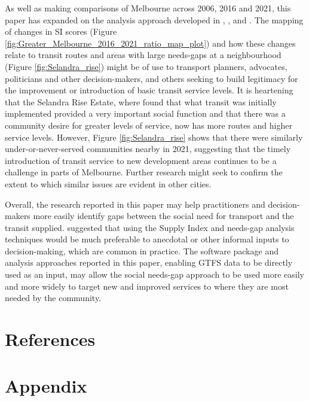 \documentclass[preprint, 3p,
authoryear]{elsarticle} %
\begin{document}
As well as making comparisons of Melbourne across 2006, 2016 and 2021,
this paper has expanded on the analysis approach developed in
\citet{Currie2003Hobart}, \citet{Currie2004Gap},
\citet{Currie2007Identifying} and \citet{currie2010identifying}. The
mapping of changes in SI scores (Figure
\ref{fig:Greater_Melbourne_2016_2021_ratio_map_plot}) and how these
changes relate to transit routes and areas with large needs-gaps at a
neighbourhood (Figure \ref{fig:Selandra_rise}) might be of use to
transport planners, advocates, politicians and other decision-makers,
and others seeking to build legitimacy for the improvement or
introduction of basic transit service levels. It is heartening that the
Selandra Rise Estate, where \citet{delbosc2015impact} found that what
transit was initially implemented provided a very important social
function and that there was a community desire for greater levels of
service, now has more routes and higher service levels. However, Figure
\ref{fig:Selandra_rise} shows that there were similarly
under-or-never-served communities nearby in 2021, suggesting that the
timely introduction of transit service to new development areas
continues to be a challenge in parts of Melbourne. Further research
might seek to confirm the extent to which similar issues are evident in
other cities.

Overall, the research reported in this paper may help practitioners and
decision-makers more easily identify gaps between the social need for
transport and the transit supplied. \citet{currie2010identifying}
suggested that using the Supply Index and needs-gap analysis techniques
would be much preferable to anecdotal or other informal inputs to
decision-making, which are common in practice. The software package and
analysis approaches reported in this paper, enabling GTFS data to be
directly used as an input, may allow the social needs-gap approach to be
used more easily and more widely to target new and improved services to
where they are most needed by the community.

\section*{References}\label{references}

\section{Appendix}\label{appendix}
\end{document}

